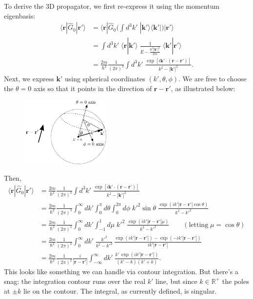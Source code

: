 \documentclass[prx,12pt]{revtex4-2}
\begin{document}
To derive the 3D propagator, we first re-express it using the momentum
eigenbasis:
\begin{align}
  \langle\mathbf{r}|\hat{G}_0|\mathbf{r}'\rangle
  &= \langle\mathbf{r}|\hat{G}_0 \Big(\int d^3k'\; |\mathbf{k}'\rangle\langle\mathbf{k}'| \Big) |\mathbf{r}'\rangle \nonumber \\
  &= \int d^3k' \; \langle\mathbf{r}|\mathbf{k}'\rangle \;
  \frac{1}{E-\frac{\hbar^2|\mathbf{k}'|^2}{2m}} \;
  \langle\mathbf{k}'|\mathbf{r}'\rangle \nonumber \\
  &= \frac{2m}{\hbar^2} \frac{1}{(2\pi)^3} \int d^3k' \;
  \frac{\exp\left[i\mathbf{k}' \cdot
      (\mathbf{r}-\mathbf{r}')\right]}{k^2-|\mathbf{k}'|^2}.
  \label{rGr}
\end{align}
Next, we express $\mathbf{k}'$ using spherical coordinates
$(k',\theta,\phi)$.  We are free to choose the $\theta=0$ axis so that
it points in the direction of $\mathbf{r}-\mathbf{r}'$, as illustrated
below:

\begin{figure}[h]
  \centering\includegraphics[width=0.4\textwidth]{spherical_coords}
\end{figure}

\noindent
Then,
\begin{align}
  \langle\mathbf{r}|\hat{G}_0|\mathbf{r}'\rangle &= \frac{2m}{\hbar^2} \frac{1}{(2\pi)^3} \int d^3k' \; \frac{\exp\left[i\mathbf{k}'\cdot (\mathbf{r}-\mathbf{r}')\right]}{k^2-|\mathbf{k}'|^2} \nonumber \\
  &= \frac{2m}{\hbar^2} \frac{1}{(2\pi)^3} \int_0^\infty dk' \int_0^\pi d\theta \int_{0}^{2\pi} d\phi \;{k'}^{2}\sin\theta\; \frac{\displaystyle \exp\left(ik'|\mathbf{r}-\mathbf{r}'|\cos\theta\right)}{k^2-{k'}^2} \nonumber \\
  &= \frac{2m}{\hbar^2} \frac{1}{(2\pi)^2} \int_0^\infty dk' \int_{-1}^1 d\mu \;{k'}^2\; \frac{\displaystyle \exp\left(ik'|\mathbf{r}-\mathbf{r}'|\mu\right)}{k^2-{k'}^2} \qquad(\text{letting}\;\mu = \cos\theta) \nonumber \\
  &= \frac{2m}{\hbar^2} \frac{1}{(2\pi)^2} \int_0^\infty dk' \; \frac{ {k'}^2}{k^2-{k'}^2}\, \frac{\displaystyle \exp\left(ik'|\mathbf{r}-\mathbf{r}'|\right) - \exp\left(-ik'|\mathbf{r}-\mathbf{r}'|\right)}{ik'|\mathbf{r}-\mathbf{r}'|} \nonumber\\
  &= \frac{2m}{\hbar^2} \frac{1}{(2\pi)^2} \frac{i}{|\mathbf{r}-\mathbf{r}'|} \int_{-\infty}^\infty dk' \; \frac{\displaystyle k'\, \exp\left(ik'|\mathbf{r}-\mathbf{r}'|\right)}{(k' - k)(k'+k)}.
  \label{rGrintegrand}
\end{align}
This looks like something we can handle via contour integration.  But
there's a snag: the integration contour runs over the real $k'$ line,
but since $k \in \mathbb{R}^+$ the poles at $\pm k$ lie on the
contour.  The integral, as currently defined, is singular.
\end{document}
